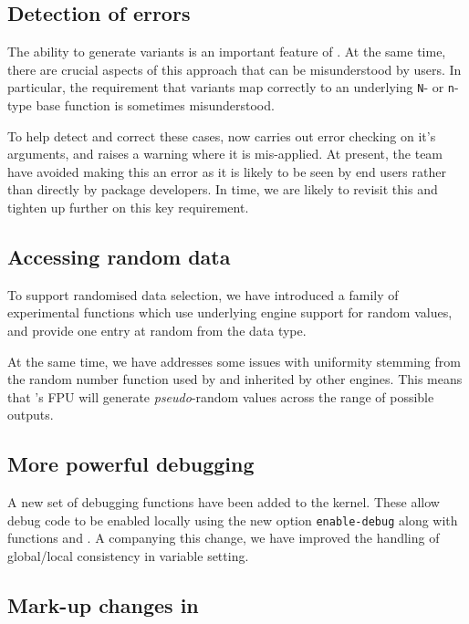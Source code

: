 \documentclass{ltnews}
\begin{document}
\subsection{Detection of  errors}

The ability to generate variants is an important feature of . At
the same time,  there are crucial aspects of this approach that can be
misunderstood by users. In particular, the requirement that variants map
correctly to an underlying \verb|N|- or \verb|n|-type base function is sometimes
misunderstood.

To help detect and correct these cases,  now
carries out error checking on it's arguments, and raises a warning where
it is mis-applied. At present, the team have avoided making this an error
as it is likely to be seen by end users rather than directly by package
developers. In time, we are likely to revisit this and tighten up
further on this key requirement.

\subsection{Accessing random data}

To support randomised data selection, we have introduced a family of
experimental functions which use underlying engine support for random values,
and provide one entry at random from the data type.

At the same time, we have addresses some issues with uniformity stemming from
the random number function used by  and inherited by other
engines. This means that 's FPU will generate \emph{pseudo}-random
values across the range of possible outputs.

\subsection{More powerful debugging}

A new set of debugging functions have been added to the kernel. These allow
debug code to be enabled locally using the new option \verb|enable-debug| along
with functions  and
. A companying this change, we have improved
the handling of global/local consistency in variable setting.

\subsection{Mark-up changes in }
\end{document}
